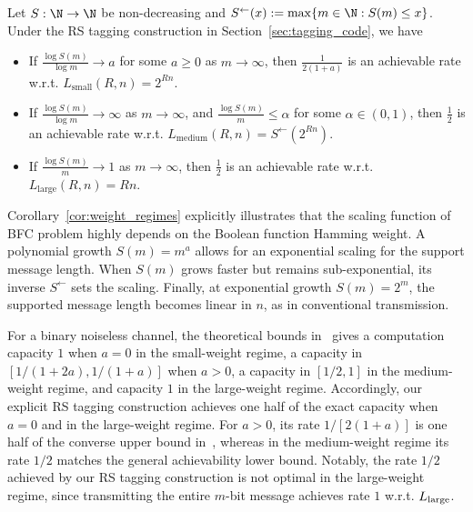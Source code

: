 \begin{corollary}
    \label{cor:weight_regimes}
    Let $S:\N\to\N$ be non-decreasing and $S^{\leftarrow}(x):=\max\{m\in\N:S(m)\leq x\}$. Under the RS tagging construction in Section~\ref{sec:tagging_code}, we have
    \begin{itemize}
        \item If $\frac{\log S(m)}{\log m}\to a$ for some $a\geq 0$ as $m\to\infty$, then $\frac{1}{2(1+a)}$ is an achievable rate w.r.t. $L_{\mathrm{small}}(R,n)=2^{Rn}$.
        \item If $\frac{\log S(m)}{\log m}\to \infty$ as $m\to\infty$, and $\frac{\log S(m)}{m}\leq \alpha$ for some $\alpha\in(0,1)$, then $\frac{1}{2}$ is an achievable rate w.r.t. $L_{\mathrm{medium}}(R,n)=S^{\leftarrow}(2^{Rn})$.
        \item If $\frac{\log S(m)}{m}\to 1$ as $m\to\infty$, then $\frac{1}{2}$ is an achievable rate w.r.t. $L_{\mathrm{large}}(R,n)=Rn$.
    \end{itemize}
\end{corollary}



Corollary~\ref{cor:weight_regimes} explicitly illustrates that the scaling function of BFC problem highly depends on the Boolean function Hamming weight. A polynomial growth $S(m)=m^a$ allows for an exponential scaling for the support message length. When $S(m)$ grows faster but remains sub-exponential, its inverse $S^{\leftarrow}$ sets the scaling. Finally, at exponential growth $S(m)=2^m$, the supported message length becomes linear in $n$, as in conventional transmission.

For a binary noiseless channel, the theoretical bounds in~\cite{BFC-capacity} gives a computation capacity $1$ when $a=0$ in the small-weight regime, a capacity in $[1/(1+2a),1/(1+a)]$ when $a>0$, a capacity in $[1/2,1]$ in the medium-weight regime, and capacity $1$ in the large-weight regime.
Accordingly, our explicit RS tagging construction achieves one half of the exact capacity when $a=0$ and in the large-weight regime. For $a>0$, its rate $1/[2(1+a)]$ is one half of the converse upper bound in~\cite{BFC-capacity}, whereas in the medium-weight regime its rate $1/2$ matches the general achievability lower bound.
Notably, the rate $1/2$ achieved by our RS tagging construction is not optimal in the large-weight regime, since transmitting the entire $m$-bit message achieves rate $1$ w.r.t. $L_{\rm large}$.


